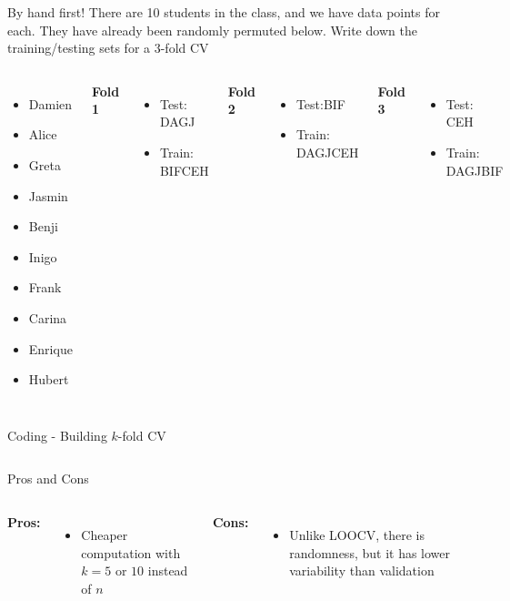 \documentclass[aspectratio=169,usenames,dvipsnames]{beamer}
\newcommand{\InstructorList}[1]{
\begin{itemize}
	\color{orange}
	#1
\end{itemize}
}
\begin{document}
{
\begin{frame}[t]{By hand first!}
There are 10 students in the class, and we have data points for each. They have already been randomly permuted below. 
Write down the training/testing sets for a $3$-fold CV
\begin{columns}
\centering

\begin{itemize}
	\item Damien 
	\item Alice
	\item Greta 
	\item Jasmin
	\item Benji 
	\item Inigo
	\item Frank 
	\item Carina 
	\item Enrique 
	\item Hubert 
\end{itemize}

\centering
\textbf{Fold 1}

\InstructorList{
  \item Test: DAGJ
  \item Train: BIFCEH
}

\vspace{2in}
\centering
\textbf{Fold 2}
\InstructorList{
  \item Test:BIF 
  \item Train: DAGJCEH
}
\vspace{2in}
\centering
\textbf{Fold 3}
\InstructorList{
  \item Test: CEH
  \item Train: DAGJBIF
}
\vspace{2in}
\end{columns}
\end{frame}
}
{
\begin{frame}[t]{Coding - Building $k$-fold CV}
\begin{columns}
\centering
{}
\centering
\end{columns}
\end{frame}
}
\begin{frame}[t]{Pros and Cons}

\begin{columns}
\centering
\textbf{Pros:}
\InstructorList{
\item Cheaper computation with $k = 5$ or $10$ instead of $n$
}
\centering
\textbf{Cons:}
\InstructorList{
\item Unlike LOOCV, there is randomness, but it has lower variability  than validation

}

\end{columns}

\end{frame}
\end{document}
